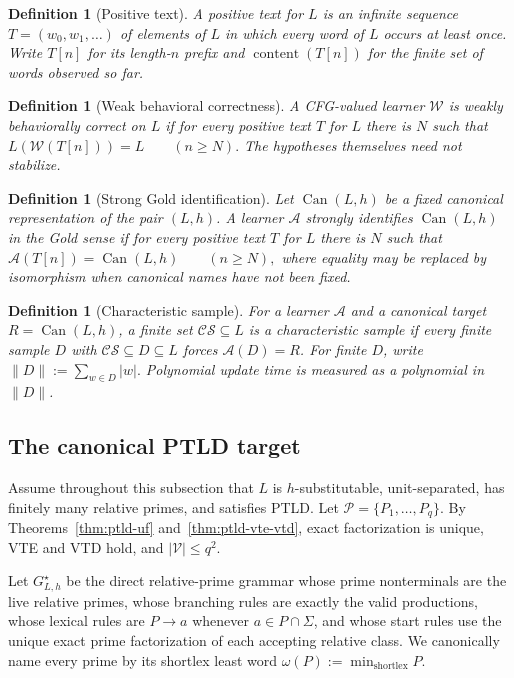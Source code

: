 \documentclass[11pt,a4paper]{article}
\newtheorem{definition}[theorem]{Definition}
\newcommand{\Pcal}{\mathcal P}
\newcommand{\Vcal}{\mathcal V}
\newcommand{\CS}{\mathcal{C}\!\mathcal{S}}
\newcommand{\Can}{\operatorname{Can}}
\begin{document}
\begin{definition}[Positive text]
A \emph{positive text} for $L$ is an infinite sequence $T=(w_0,w_1,\ldots)$ of elements of $L$ in which every word of $L$ occurs at least once.  Write $T[n]$ for its length-$n$ prefix and $\operatorname{content}(T[n])$ for the finite set of words observed so far.
\end{definition}

\begin{definition}[Weak behavioral correctness]
A CFG-valued learner $\mathcal W$ is \emph{weakly behaviorally correct} on $L$ if for every positive text $T$ for $L$ there is $N$ such that
\(L(\mathcal W(T[n]))=L \qquad(n\ge N).\)
The hypotheses themselves need not stabilize.
\end{definition}

\begin{definition}[Strong Gold identification]
Let $\Can(L,h)$ be a fixed canonical representation of the pair $(L,h)$.  A learner $\mathcal A$ \emph{strongly identifies} $\Can(L,h)$ in the Gold sense if for every positive text $T$ for $L$ there is $N$ such that
\(\mathcal A(T[n])=\Can(L,h) \qquad(n\ge N),\)
where equality may be replaced by isomorphism when canonical names have not been fixed.
\end{definition}

\begin{definition}[Characteristic sample]
For a learner $\mathcal A$ and a canonical target $R=\Can(L,h)$, a finite set $\CS\subseteq L$ is a \emph{characteristic sample} if every finite sample $D$ with
\(\CS\subseteq D\subseteq L\)
forces $\mathcal A(D)=R$.
For finite $D$, write
\(\|D\|:=\sum_{w\in D}|w|.\)
Polynomial update time is measured as a polynomial in $\|D\|$.
\end{definition}

\subsection{The canonical PTLD target}

Assume throughout this subsection that $L$ is $h$-substitutable, unit-separated, has finitely many relative primes, and satisfies PTLD.  Let
\(\Pcal=\{P_1,\ldots,P_q\}.\)
By Theorems~\ref{thm:ptld-uf} and~\ref{thm:ptld-vte-vtd}, exact factorization is unique, VTE and VTD hold, and $|\Vcal|\le q^2$.

Let $G^\star_{L,h}$ be the direct relative-prime grammar whose prime nonterminals are the live relative primes, whose branching rules are exactly the valid productions, whose lexical rules are $P\to a$ whenever $a\in P\cap\Sigma$, and whose start rules use the unique exact prime factorization of each accepting relative class.  We canonically name every prime by its shortlex least word
\(\omega(P):=\min_{\mathrm{shortlex}}P.\)
\end{document}
